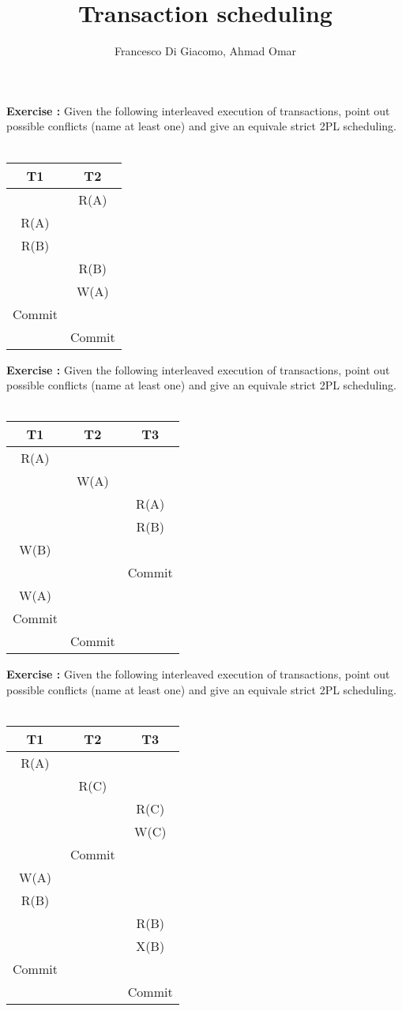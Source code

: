 \documentclass[10pt,a4paper]{article}
\author{Francesco Di Giacomo, Ahmad Omar}
\date { }
\title{Transaction scheduling}
\newcommand{\exerciseDesc}{Given the following interleaved execution of transactions, point out possible conflicts (name at least one) and give an equivale strict 2PL scheduling.}
\newcounter{exerciseCount}
\newcommand{\exercise}[1]
{
	\noindent
	\textbf{Exercise \theexerciseCount:} \exerciseDesc \\\\#1
	\setcounter{exerciseCount}{\theexerciseCount + 1}
}
\begin{document}
	\maketitle
	
	\exercise{\begin{table}[!h]
			\centering
			\begin{tabular}{c|c}
				T1 & T2 \\
				\hline
				& R(A) \\
				R(A) & \\
				R(B) & \\
				& R(B) \\
				& W(A) \\
				Commit & \\
				& Commit \\
			\end{tabular}
	\end{table}}

	\exercise{\begin{table}[!h]
			\centering
			\begin{tabular}{c|c|c}
				T1 & T2 & T3 \\
				\hline
				R(A) & & \\
				& W(A) & \\
				& & R(A) \\
				& & R(B) \\
				W(B) & & \\
				& & Commit \\
				W(A) & & \\
				Commit & & \\
				& Commit &
			\end{tabular}
	\end{table}}
	
	\newpage
	\exercise{\begin{table}[!h]
			\centering
			\begin{tabular}{c|c|c}
				T1 & T2 & T3 \\
				\hline
				R(A) & & \\
				& R(C) & \\
				& & R(C) \\
				& & W(C) \\
				& Commit & \\
				W(A) & & \\
				R(B) & & \\
				& & R(B) \\
				& & X(B) \\
				Commit & & \\
				& & Commit
			\end{tabular}
	\end{table}}
\end{document}
